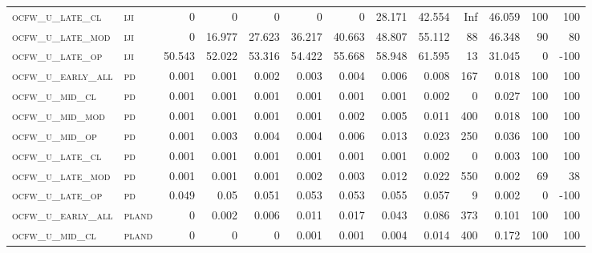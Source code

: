 \begin{landscape}
\begin{center}
\begin{footnotesize}
\begin{longtable}{llrrrrrrrr|rrr}
\textsc{ocfw\_u\_late\_cl  } & \textsc{iji       }   & 0        & 0        & 0        & 0        & 0        & 28.171   & 42.554    & Inf    & 46.059        & 100           & 100             \\
\textsc{ocfw\_u\_late\_mod } & \textsc{iji       }   & 0        & 16.977   & 27.623   & 36.217   & 40.663   & 48.807   & 55.112    & 88     & 46.348        & 90            & 80              \\
\textsc{ocfw\_u\_late\_op  } & \textsc{iji       }   & 50.543   & 52.022   & 53.316   & 54.422   & 55.668   & 58.948   & 61.595    & 13     & 31.045        & 0             & -100            \\
\textsc{ocfw\_u\_early\_all} & \textsc{pd        }   & 0.001    & 0.001    & 0.002    & 0.003    & 0.004    & 0.006    & 0.008     & 167    & 0.018         & 100           & 100             \\
\textsc{ocfw\_u\_mid\_cl   } & \textsc{pd        }   & 0.001    & 0.001    & 0.001    & 0.001    & 0.001    & 0.001    & 0.002     & 0      & 0.027         & 100           & 100             \\
\textsc{ocfw\_u\_mid\_mod  } & \textsc{pd        }   & 0.001    & 0.001    & 0.001    & 0.001    & 0.002    & 0.005    & 0.011     & 400    & 0.018         & 100           & 100             \\
\textsc{ocfw\_u\_mid\_op   } & \textsc{pd        }   & 0.001    & 0.003    & 0.004    & 0.004    & 0.006    & 0.013    & 0.023     & 250    & 0.036         & 100           & 100             \\
\textsc{ocfw\_u\_late\_cl  } & \textsc{pd        }   & 0.001    & 0.001    & 0.001    & 0.001    & 0.001    & 0.001    & 0.002     & 0      & 0.003         & 100           & 100             \\
\textsc{ocfw\_u\_late\_mod } & \textsc{pd        }   & 0.001    & 0.001    & 0.001    & 0.002    & 0.003    & 0.012    & 0.022     & 550    & 0.002         & 69            & 38              \\
\textsc{ocfw\_u\_late\_op  } & \textsc{pd        }   & 0.049    & 0.05     & 0.051    & 0.053    & 0.053    & 0.055    & 0.057     & 9      & 0.002         & 0             & -100            \\
\textsc{ocfw\_u\_early\_all} & \textsc{pland     }   & 0        & 0.002    & 0.006    & 0.011    & 0.017    & 0.043    & 0.086     & 373    & 0.101         & 100           & 100             \\
\textsc{ocfw\_u\_mid\_cl   } & \textsc{pland     }   & 0        & 0        & 0        & 0.001    & 0.001    & 0.004    & 0.014     & 400    & 0.172         & 100           & 100             \\

\end{longtable}
\end{footnotesize}
\end{center}
\end{landscape}
